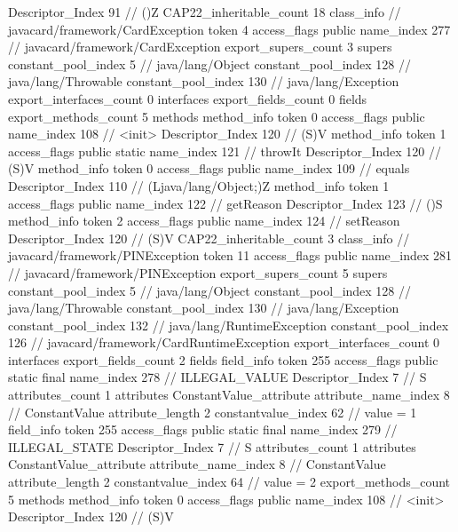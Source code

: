 {{{{{					Descriptor_Index	91		// ()Z
				}
			}
			CAP22_inheritable_count	18
		}
		class_info {		// javacard/framework/CardException
			token	4
			access_flags	public
			name_index	277		// javacard/framework/CardException
			export_supers_count	3
			supers {
				constant_pool_index	5		// java/lang/Object
				constant_pool_index	128		// java/lang/Throwable
				constant_pool_index	130		// java/lang/Exception
			}
			export_interfaces_count	0
			interfaces {
			}
			export_fields_count	0
			fields {
			}
			export_methods_count	5
			methods {
				method_info {
					token	0
					access_flags	public
					name_index	108		// <init>
					Descriptor_Index	120		// (S)V
				}
				method_info {
					token	1
					access_flags	public static
					name_index	121		// throwIt
					Descriptor_Index	120		// (S)V
				}
				method_info {
					token	0
					access_flags	public
					name_index	109		// equals
					Descriptor_Index	110		// (Ljava/lang/Object;)Z
				}
				method_info {
					token	1
					access_flags	public
					name_index	122		// getReason
					Descriptor_Index	123		// ()S
				}
				method_info {
					token	2
					access_flags	public
					name_index	124		// setReason
					Descriptor_Index	120		// (S)V
				}
			}
			CAP22_inheritable_count	3
		}
		class_info {		// javacard/framework/PINException
			token	11
			access_flags	public
			name_index	281		// javacard/framework/PINException
			export_supers_count	5
			supers {
				constant_pool_index	5		// java/lang/Object
				constant_pool_index	128		// java/lang/Throwable
				constant_pool_index	130		// java/lang/Exception
				constant_pool_index	132		// java/lang/RuntimeException
				constant_pool_index	126		// javacard/framework/CardRuntimeException
			}
			export_interfaces_count	0
			interfaces {
			}
			export_fields_count	2
			fields {
			field_info {
				token	255
				access_flags	public static final
				name_index	278		// ILLEGAL_VALUE
				Descriptor_Index	7		// S
				attributes_count	1
				attributes {
				ConstantValue_attribute {
					attribute_name_index	8		// ConstantValue
					attribute_length	2
					constantvalue_index	62		// value = 1
				}
				}
			}
			field_info {
				token	255
				access_flags	public static final
				name_index	279		// ILLEGAL_STATE
				Descriptor_Index	7		// S
				attributes_count	1
				attributes {
				ConstantValue_attribute {
					attribute_name_index	8		// ConstantValue
					attribute_length	2
					constantvalue_index	64		// value = 2
				}
				}
			}
			}
			export_methods_count	5
			methods {
				method_info {
					token	0
					access_flags	public
					name_index	108		// <init>
					Descriptor_Index	120		// (S)V
}}}}}
